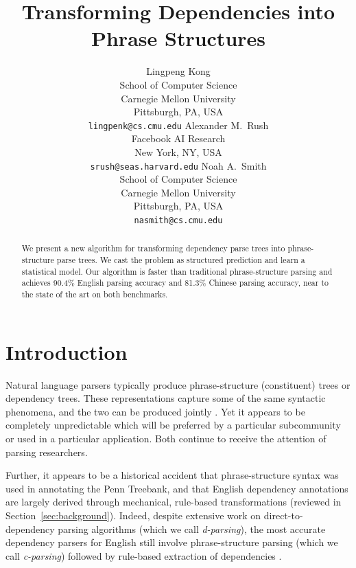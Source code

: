 \documentclass[11pt,letterpaper]{article}
\title{Transforming Dependencies into Phrase Structures }
\author{Lingpeng Kong\\
      School of Computer Science\\
  	Carnegie Mellon University\\
  	Pittsburgh, PA, USA\\
  {\tt lingpenk@cs.cmu.edu}
	  \And
      Alexander M.~Rush\\
	    Facebook AI Research \\
	    New York, NY, USA \\
	    {\tt srush@seas.harvard.edu}
	  \And
	Noah A.~Smith\\
      School of Computer Science\\
  	Carnegie Mellon University\\
  	Pittsburgh, PA, USA\\
  {\tt nasmith@cs.cmu.edu}}
\date{}
\newcommand{\nascomment}[1]{\textcolor{blue}{\bf \small [#1 --nas]}}
\begin{document}
\maketitle
\begin{abstract}
We present a new algorithm for transforming dependency parse trees into
phrase-structure parse trees.  We cast the problem as  structured
prediction and learn a statistical model.  Our algorithm is faster than traditional
phrase-structure parsing and achieves 90.4\% English parsing accuracy and 81.3\% Chinese parsing accuracy, near to the state of
the art on both benchmarks.




\end{abstract}

\section{Introduction}


Natural language parsers typically produce phrase-structure (constituent) trees or dependency trees.  These representations capture
some of the same syntactic phenomena, and the two can be produced
jointly \cite{klein2002fast,hall2008dependency,carreras2008tag,rush2010dual}.  Yet it
appears to be completely unpredictable which will be preferred by a
particular subcommunity or used in a particular application.  Both continue to receive the attention of
parsing researchers.


Further, it appears to be a historical accident that phrase-structure
syntax was used in annotating the Penn Treebank, and that English
dependency annotations are largely derived through mechanical,
rule-based transformations (reviewed in Section~\ref{sec:background}).  Indeed,
despite extensive work on direct-to-dependency parsing algorithms
(which we call \emph{d-parsing}), the most accurate dependency
parsers for English still involve phrase-structure parsing (which we
call \emph{c-parsing}) followed by rule-based extraction of
dependencies \cite{kong2014empirical}.
\end{document}
